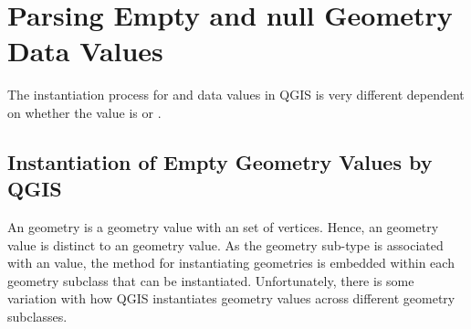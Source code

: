 \documentclass[a4paper,11pt,english]{sphinxmanual}
\begin{document}
\begin{sphinxVerbatim}[commandchars=\\\{\}]
   
  
  
  
\PYG{p}{[}\PYG{p}{]}
\end{sphinxVerbatim}


\section{Parsing Empty and null Geometry Data Values}
\label{\detokenize{QGISproblems:parsing-empty-and-null-geometry-data-values}}
The instantiation process for  and  data values in QGIS is very different dependent on whether the value is  or .


\subsection{Instantiation of Empty Geometry Values by QGIS}
\label{\detokenize{QGISproblems:instantiation-of-empty-geometry-values-by-qgis}}
An  geometry is a geometry value with an  set of vertices.  Hence, an  geometry value is distinct to an  geometry value.  As the geometry sub-type is associated with an  value, the method for instantiating  geometries is embedded within each geometry subclass that can be instantiated.  Unfortunately, there is some variation with how QGIS instantiates  geometry values across different geometry subclasses.
\end{document}
